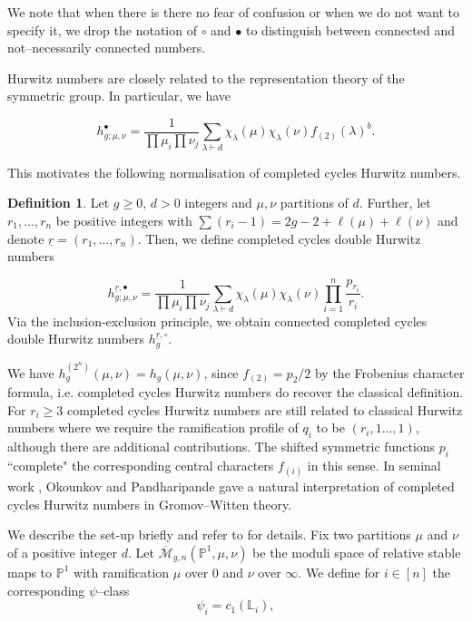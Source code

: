 \documentclass[10pt,a4paper,oneside,no-math,reqno]{amsart}%
\theoremstyle{plain}
\theoremstyle{definition}
\newtheorem{definition}[theorem]{Definition}
\theoremstyle{remark}
\numberwithin{equation}{section}
\newcommand{\1}{\mathds{1}}
\newcommand{\<}{\langle}
\renewcommand{\>}{\rangle}
\begin{document}
We note that when there is there no fear of confusion or when we do not want to specify it, we drop the notation of $\circ$ and $\bullet$ to distinguish between connected and not--necessarily connected numbers.

Hurwitz numbers are closely related to the representation theory of the symmetric group. In particular, we have

\begin{equation}
    h^\bullet_{g;\mu,\nu}
    =
    \frac{1}{\prod \mu_i\prod\nu_j} \sum_{\lambda\vdash d} \chi_\lambda(\mu) \chi_\lambda(\nu) f_{(2)}(\lambda)^b.
\end{equation}

This motivates the following normalisation of completed cycles Hurwitz numbers.

\begin{definition}\label{CCHNdef}
    Let $g\ge0$, $d>0$ integers and $\mu,\nu$ partitions of $d$. Further, let $r_1,\dots,r_n$ be positive integers with $\sum (r_i-1)=2g-2+\ell(\mu)+\ell(\nu)$ and denote $\underline{r}=(r_1,\dots,r_n)$. Then, we define completed cycles double Hurwitz numbers

    \begin{equation}
        h^{\underline{r},\bullet}_{g;\mu,\nu}
        =
        \frac{1}{\prod \mu_i\prod\nu_j} \sum_{\lambda\vdash d} \chi_\lambda(\mu) \chi_\lambda(\nu) \prod_{i=1}^n \frac{p_{r_i}}{r_i}.
    \end{equation}
    Via the inclusion-exclusion principle, we obtain connected completed cycles double Hurwitz numbers $h_g^{\underline{r},\circ}$.
\end{definition}

We have $h_g^{(2^n)}(\mu,\nu) = h_g(\mu,\nu)$, since $f_{(2)}=p_2/2$ by the Frobenius character formula, i.e. completed cycles Hurwitz numbers do recover the classical definition. For $r_i \ge 3 $ completed cycles Hurwitz numbers are still related to classical Hurwitz numbers where we require the ramification profile of $q_i$ to be $(r_i,1\dots,1)$, although there are additional contributions. The shifted symmetric functions $p_i$ ``complete" the corresponding central characters $f_{(i)}$ in this sense. In seminal work \cite{OP06a}, Okounkov and Pandharipande gave a natural interpretation of completed cycles Hurwitz numbers in Gromov--Witten theory.

We describe the set-up briefly and refer to \cite{OP06a} for details. Fix two partitions $\mu$ and $\nu$ of a positive integer $d$. Let $\overline{\mathcal{M}}_{g,n}(\mathbb{P}^1,\mu,\nu)$ be the moduli space of relative stable maps to $\mathbb{P}^1$ with ramification $\mu$ over $0$ and $\nu$ over $\infty$. We define for $i\in[n]$ the corresponding $\psi$--class
\begin{equation}
    \psi_i
    =
    c_1(\mathbb{L}_i),
\end{equation}
\end{document}
